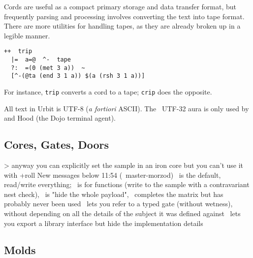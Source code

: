 
Cords are useful as a compact primary storage and data transfer format, but frequently parsing and processing involves converting the text into tape format.  There are more utilities for handling tapes, as they are already broken up in a legible manner.

\begin{lstlisting}
++  trip
  |=  a=@  ^-  tape
  ?:  =(0 (met 3 a))  ~
  [^-(@ta (end 3 1 a)) $(a (rsh 3 1 a))]
\end{lstlisting}


For instance, \texttt{trip} converts a cord to a tape; \texttt{crip} does the opposite.




All text in Urbit is UTF-8 (\emph{a fortiori} ASCII).  The \patc~UTF-32 aura is only used by \dill and Hood (the Dojo terminal agent).


\subsection{Cores, Gates, Doors}

> anyway you can explicitly set the sample in an iron core
but you can't use it with +roll
New messages below
11:54 (~master-morzod)
\gold~is the default, read/write everything; \iron~is for functions (write to the sample with a contravariant nest check), \lead~is "hide the whole payload", \zinc~completes the matrix
but has probably never been used
\iron~lets you refer to a typed gate (without wetness), without depending on all the details of the subject it was defined against
\lead~lets you export a library interface but hide the implementation details

\subsection{Molds}

